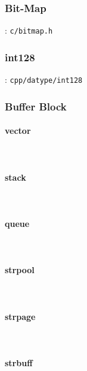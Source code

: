 
\subsubsection{Bit-Map}
: \verb`c/bitmap.h`

\subsubsection{int128}
: \verb`cpp/datype/int128`

\subsubsection{Buffer Block}

\paragraph{vector} \

\paragraph{stack} \

\paragraph{queue} \

\paragraph{strpool} \

\paragraph{strpage} \

\paragraph{strbuff} \
